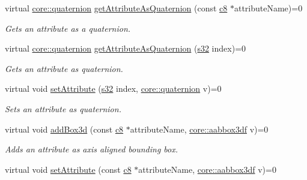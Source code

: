 \begin{DoxyCompactItemize}
virtual \hyperlink{classirr_1_1core_1_1quaternion}{core\+::quaternion} \hyperlink{classirr_1_1io_1_1IAttributes_a59248466d3f3ea2d7930876e577b222d}{get\+Attribute\+As\+Quaternion} (const \hyperlink{namespaceirr_a9395eaea339bcb546b319e9c96bf7410}{c8} $\ast$attribute\+Name)=0
\begin{DoxyCompactList}\small\item\em Gets an attribute as a quaternion. \end{DoxyCompactList}\item 
virtual \hyperlink{classirr_1_1core_1_1quaternion}{core\+::quaternion} \hyperlink{classirr_1_1io_1_1IAttributes_aee7cc16cae259af9cbdd37bfc9956a5f}{get\+Attribute\+As\+Quaternion} (\hyperlink{namespaceirr_ac66849b7a6ed16e30ebede579f9b47c6}{s32} index)=0
\begin{DoxyCompactList}\small\item\em Gets an attribute as quaternion. \end{DoxyCompactList}\item 
\mbox{\label{classirr_1_1io_1_1IAttributes_ac727ca222d4604f04742f391c9e18008}} 
virtual void \hyperlink{classirr_1_1io_1_1IAttributes_ac727ca222d4604f04742f391c9e18008}{set\+Attribute} (\hyperlink{namespaceirr_ac66849b7a6ed16e30ebede579f9b47c6}{s32} index, \hyperlink{classirr_1_1core_1_1quaternion}{core\+::quaternion} v)=0
\begin{DoxyCompactList}\small\item\em Sets an attribute as quaternion. \end{DoxyCompactList}\item 
\mbox{\label{classirr_1_1io_1_1IAttributes_adb9f747bf01137075e8e30f0d75cb56c}} 
virtual void \hyperlink{classirr_1_1io_1_1IAttributes_adb9f747bf01137075e8e30f0d75cb56c}{add\+Box3d} (const \hyperlink{namespaceirr_a9395eaea339bcb546b319e9c96bf7410}{c8} $\ast$attribute\+Name, \hyperlink{namespaceirr_1_1core_a60f4b4c744aba55f10530d503c6ecb04}{core\+::aabbox3df} v)=0
\begin{DoxyCompactList}\small\item\em Adds an attribute as axis aligned bounding box. \end{DoxyCompactList}\item 
\mbox{\label{classirr_1_1io_1_1IAttributes_a1b876bafce99d3401c2157c0a01dd9f6}} 
virtual void \hyperlink{classirr_1_1io_1_1IAttributes_a1b876bafce99d3401c2157c0a01dd9f6}{set\+Attribute} (const \hyperlink{namespaceirr_a9395eaea339bcb546b319e9c96bf7410}{c8} $\ast$attribute\+Name, \hyperlink{namespaceirr_1_1core_a60f4b4c744aba55f10530d503c6ecb04}{core\+::aabbox3df} v)=0

\end{DoxyCompactItemize}
